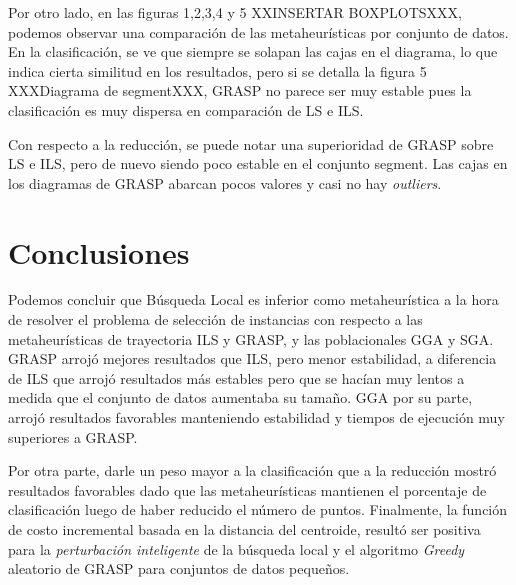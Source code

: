\documentclass{ci5652}
\begin{document}
Por otro lado, en las figuras 1,2,3,4 y 5 XXINSERTAR BOXPLOTSXXX, podemos observar una comparación de las metaheurísticas por conjunto de datos. En la clasificación, se ve que siempre se solapan las cajas en el diagrama, lo que indica cierta similitud en los resultados, pero si se detalla la figura 5 XXXDiagrama de segmentXXX, GRASP no parece ser muy estable pues la clasificación es muy dispersa en comparación de LS e ILS. 

Con respecto a la reducción, se puede notar una superioridad de GRASP sobre LS e ILS, pero de nuevo siendo poco estable en el conjunto segment. Las cajas en los diagramas de GRASP abarcan pocos valores y casi no hay \textit{outliers}.



\section*{Conclusiones}

Podemos concluir que Búsqueda Local es inferior como metaheurística a la hora de resolver el problema de selección de instancias con respecto a las metaheurísticas de trayectoria ILS y GRASP, y las poblacionales GGA y SGA. GRASP arrojó mejores resultados que ILS, pero menor estabilidad, a diferencia de ILS que arrojó resultados más estables pero que se hacían muy lentos a medida que el conjunto de datos aumentaba su tamaño. GGA por su parte, arrojó resultados favorables manteniendo estabilidad y tiempos de ejecución muy superiores a GRASP.

Por otra parte, darle un peso mayor a la clasificación que a la reducción mostró resultados favorables dado que las metaheurísticas mantienen el porcentaje de clasificación luego de haber reducido el número de puntos. Finalmente, la función de costo incremental basada en la distancia del centroide, resultó ser positiva para la \textit{perturbación inteligente} de la búsqueda local y el algoritmo \textit{Greedy} aleatorio de GRASP para conjuntos de datos pequeños.

\small



\end{document}
